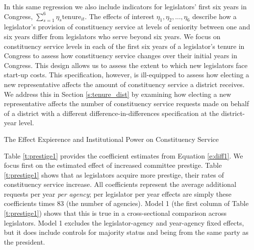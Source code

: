\documentclass[12pt]{article}
\begin{document}
In this same regression we also include indicators for legislators' first six years in Congress, $ \sum_{s = 1}^{6} \eta_{s} \text{tenure}_{it}$. The effects of interest $\eta_{1}, \eta_{2}, \hdots, \eta_{6}$ describe how a legislator's provision of constituency service at levels of seniority between one and six years differ from legislators who serve beyond six years. We focus on constituency service levels in each of the first six years of a legislator's tenure in Congress to assess how constituency service changes over their initial years in Congress. This design allows us to assess the extent to which new legislators face start-up costs. This specification, however, is ill-equipped to assess how electing a new representative affects the amount of constituency service a district receives. We address this in Section \ref{s:tenure_dist} by examining how electing a new representative affects the number of constituency service requests made on behalf of a district with a different difference-in-differences specification at the district-year level.   


\begin{table}[hbt!]
\caption{The Effect Expierence and Institutional Power on Constituency Service} \label{t:prestige1}

\begin{minipage}{\textwidth}
\begin{center}

\end{center}
\end{minipage}
\end{table}

Table \ref{t:prestige1} provides the coefficient estimates from Equation \ref{e:diff1}. We focus first on the estimated effect of increased committee prestige. Table \ref{t:prestige1} shows that as legislators acquire more prestige, their rates of constituency service increase. All coefficients represent the average additional requests per year \textit{per agency}; per legislator per year effects are simply these coefficients times 83 (the number of agencies).
Model 1 (the first column of Table \ref{t:prestige1}) shows that this is true in a cross-sectional comparison across legislators. Model 1 excludes the legislator-agency and year-agency fixed effects, but it does include controls for majority status and being from the same party as the president. 
\end{document}
